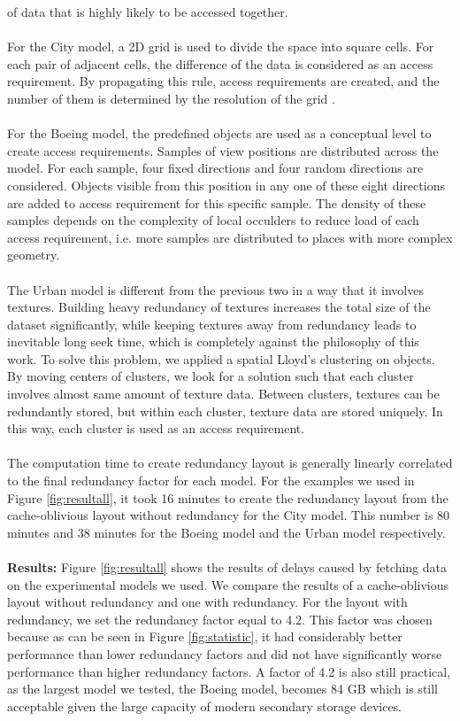 of data that is highly likely to be accessed together. \\
\\
For the City model, a 2D grid is used to divide the space into square cells. For each pair of adjacent cells, the difference of the data is considered as an access requirement. By propagating this rule, access requirements are created, and the number of them is determined by the resolution of the grid \cite{singleseeklayout}.\\
\\
For the Boeing model, the predefined objects are used as a conceptual level to create access requirements. Samples of view positions are distributed across the model. For each sample, four fixed directions and four random directions are considered. Objects visible from this position in any one of these eight directions are added to access requirement for this specific sample. The density of these samples depends on the complexity of local occulders to reduce load of each access requirement, i.e. more samples are distributed to places with more complex geometry. \\
\\
The Urban model is different from the previous two in a way that it involves textures. Building heavy redundancy of textures increases the total size of the dataset significantly, while keeping textures away from redundancy leads to inevitable long seek time, which is completely against the philosophy of this work. To solve this problem, we applied a spatial Lloyd’s clustering \cite{lloydclustering} on objects. By moving centers of clusters, we look for a solution such that each cluster involves almost same amount of texture data. Between clusters, textures can be redundantly stored, but within each cluster, texture data are stored uniquely. In this way, each cluster is used as an access requirement.  \\
\\
The computation time to create redundancy layout is generally linearly correlated to the final redundancy factor for each model. For the examples we used in Figure \ref{fig:resultall}, it took 16 minutes to create the redundancy layout from the cache-oblivious layout without redundancy for the City model. This number is 80 minutes and 38 minutes for the Boeing model and the Urban model respectively. \\
\\
\textbf{Results:}
Figure \ref{fig:resultall} shows the results of delays caused by fetching data on the experimental models we used. We compare the results of a cache-oblivious layout without redundancy and one with redundancy. For the layout with redundancy, we set the redundancy factor equal to 4.2. This factor was chosen because as can be seen in Figure \ref{fig:statistic}, it had considerably better performance than lower redundancy factors and did not have significantly worse performance than higher redundancy factors. A factor of 4.2 is also still practical, as the largest model we tested, the Boeing model, becomes 84 GB which is still acceptable given the large capacity of modern secondary storage devices.\\
